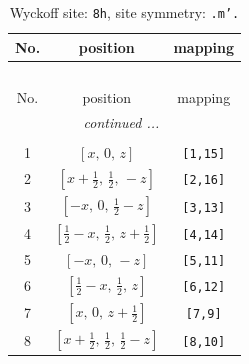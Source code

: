 \documentclass[fleqn,8pt]{jsarticle}
\begin{document}
\begin{longtable}{ccc}
\caption{Wyckoff site: {\tt 8h}, site symmetry: {\tt .m'.}}
 \\
 \hline \hline
No. & position & mapping \\ \hline \endfirsthead

\multicolumn{2}{l}{\tablename\ \thetable{}} \\
 \hline \hline
No. & position & mapping \\ \hline \endhead

 \hline \hline
\multicolumn{2}{r}{\footnotesize\it continued ...} \\ \endfoot

 \hline \hline
\multicolumn{2}{r}{} \\ \endlastfoot

1 & $\left[ x,\, 0,\, z \right]$ & {\tt [1,15]} \\ \hline
2 & $\left[ x + \frac{1}{2},\, \frac{1}{2},\, - z \right]$ & {\tt [2,16]} \\ \hline
3 & $\left[ - x,\, 0,\, \frac{1}{2} - z \right]$ & {\tt [3,13]} \\ \hline
4 & $\left[ \frac{1}{2} - x,\, \frac{1}{2},\, z + \frac{1}{2} \right]$ & {\tt [4,14]} \\ \hline
5 & $\left[ - x,\, 0,\, - z \right]$ & {\tt [5,11]} \\ \hline
6 & $\left[ \frac{1}{2} - x,\, \frac{1}{2},\, z \right]$ & {\tt [6,12]} \\ \hline
7 & $\left[ x,\, 0,\, z + \frac{1}{2} \right]$ & {\tt [7,9]} \\ \hline
8 & $\left[ x + \frac{1}{2},\, \frac{1}{2},\, \frac{1}{2} - z \right]$ & {\tt [8,10]} \\
\end{longtable}
\renewcommand{\arraystretch}{1.2}
\end{document}
